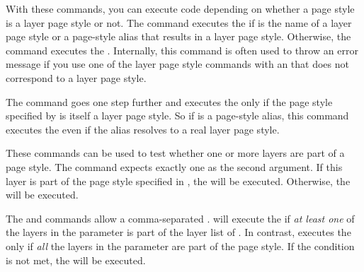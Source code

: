 \begin{Declaration}
\end{Declaration}
%
%
With these commands, you can execute code depending on whether a page style is
a layer page style or not. The  command executes
the  if  is the name of a layer page
style or a page-style alias that results in a layer page style. Otherwise, the
command executes the . Internally, this command is often used
to throw an error message if you use one of the layer page style commands with
an  that does not correspond to a layer page style.

The  command goes one step further and
executes the  only if the page style specified by  is itself a layer page style. So if  is a
page-style alias, this command executes the  even if the
alias resolves to a real layer page style.%
\EndIndexGroup


\begin{Declaration}
\end{Declaration}
%
%
These commands can be used to test whether one or more layers are part of a
page style. The  command expects exactly one
 as the second argument. If this
layer is part of the page style specified in , the
 will be executed. Otherwise, the  will be
executed.

The  and  commands
allow a comma-separated . 
will execute the  if \emph{at least one} of the layers in the
 parameter is part of the layer list of . In contrast,  executes the  only if \emph{all} the layers in the  parameter are
part of the page style. If the condition is not met, the 
will be executed.

